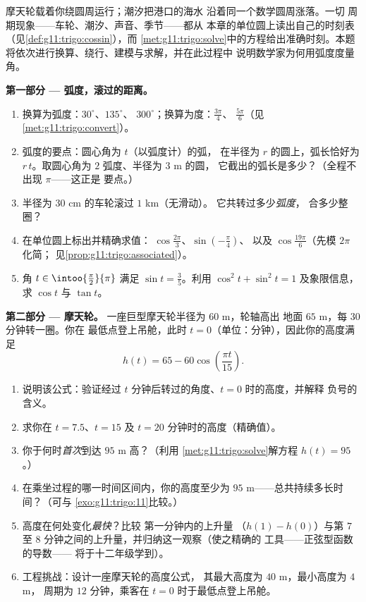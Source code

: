 \begin{problem}
\label{pb:g11:trigo:1}
摩天轮载着你绕圆周运行；潮汐把港口的海水
沿着同一个数学圆周涨落。一切
周期现象——车轮、潮汐、声音、季节——都从
本章的单位圆上读出自己的时刻表
（见\cref{def:g11:trigo:cossin}），而
\cref{met:g11:trigo:solve}中的方程给出准确时刻。本题
将依次进行换算、绕行、建模与求解，并在此过程中
说明数学家为何用弧度度量角。

\medskip
\noindent\textbf{第一部分 --- 弧度，滚过的距离。}
\begin{enumerate}
  \item 换算为弧度：$30^\circ$、$135^\circ$、
        $300^\circ$；换算为度：$\frac{3\pi}{4}$、
        $\frac{5\pi}{6}$（见\cref{met:g11:trigo:convert}）。
  \item 弧度的要点：圆心角为 $t$（以弧度计）的弧，
        在半径为 $r$ 的圆上，弧长恰好为
        $r\,t$。取圆心角为 $2$ 弧度、半径为 $3$ m 的圆，
        它截出的弧长是多少？（全程不出现 $\pi$——这正是
        要点。）
  \item 半径为 $30$ cm 的车轮滚过 $1$ km（无滑动）。
        它共转过多少\emph{弧度}，
        合多少整圈？
  \item 在单位圆上标出并精确求值：
        $\cos\frac{2\pi}{3}$、$\sin\left(-\frac{\pi}{4}\right)$、
        以及 $\cos\frac{19\pi}{6}$（先模 $2\pi$ 化简；
        见\cref{prop:g11:trigo:associated}）。
  \item 角 $t \in \intoo{\frac\pi2}{\pi}$ 满足
        $\sin t = \frac35$。利用
        $\cos^2 t + \sin^2 t = 1$ 及象限信息，求
        $\cos t$ 与 $\tan t$。
\end{enumerate}

\medskip
\noindent\textbf{第二部分 --- 摩天轮。}
一座巨型摩天轮半径为 $60$ m，轮轴高出
地面 $65$ m，每 $30$ 分钟转一圈。你在
最低点登上吊舱，此时 $t = 0$（单位：分钟），因此你的高度满足
\[
h(t) = 65 - 60 \cos\!\left(\frac{\pi t}{15}\right).
\]
\begin{enumerate}[resume]
  \item 说明该公式：验证经过 $t$
        分钟后转过的角度、$t = 0$ 时的高度，并解释
        负号的含义。
  \item 求你在 $t = 7.5$、$t = 15$ 及
        $t = 20$ 分钟时的高度（精确值）。
  \item 你于何时\emph{首次}到达 $95$ m 高？（利用
        \cref{met:g11:trigo:solve}解方程 $h(t) = 95$。）
  \item 在乘坐过程的哪一时间区间内，你的高度至少为
        $95$ m——总共持续多长时间？（可与
        \cref{exo:g11:trigo:11}比较。）
  \item 高度在何处变化\emph{最快}？比较
        第一分钟内的上升量
        （$h(1) - h(0)$）与第 $7$ 至
        $8$ 分钟之间的上升量，并归纳这一观察（使之精确的
        工具——正弦型函数的导数——
        将于十二年级学到）。
  \item 工程挑战：设计一座摩天轮的高度公式，
        其最大高度为 $40$ m，最小高度为 $4$ m，
        周期为 $12$ 分钟，乘客在
        $t = 0$ 时于最低点登上吊舱。
\end{enumerate}


\end{problem}
